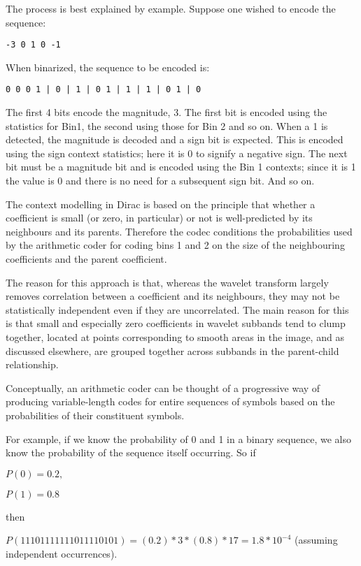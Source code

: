 The process is best explained by example. Suppose one wished to encode
the sequence:

\begin{verbatim}
-3 0 1 0 -1
\end{verbatim}

When binarized, the sequence to be encoded is:

\begin{verbatim}
0 0 0 1 | 0 | 1 | 0 1 | 1 | 1 | 0 1 | 0
\end{verbatim}

The first 4 bits encode the magnitude, 3. The first bit is encoded using
the statistics for Bin1, the second using those for Bin 2 and so on.
When a 1 is detected, the magnitude is decoded and a sign bit is
expected. This is encoded using the sign context statistics; here it is
0 to signify a negative sign. The next bit must be a magnitude bit and
is encoded using the Bin 1 contexts; since it is 1 the value is 0 and
there is no need for a subsequent sign bit. And so on.

The context modelling in Dirac is based on the principle that whether a
coefficient is small (or zero, in particular) or not is well-predicted
by its neighbours and its parents. Therefore the codec conditions the
probabilities used by the arithmetic coder for coding bins 1 and 2 on
the size of the neighbouring coefficients and the parent coefficient.

The reason for this approach is that, whereas the wavelet transform
largely removes correlation between a coefficient and its neighbours,
they may not be statistically independent even if they are uncorrelated.
The main reason for this is that small and especially zero coefficients
in wavelet subbands tend to clump together, located at points
corresponding to smooth areas in the image, and as discussed elsewhere,
are grouped together across subbands in the parent-child relationship.

Conceptually, an arithmetic coder can be thought of a progressive way of
producing variable-length codes for entire sequences of symbols based on
the probabilities of their constituent symbols.

For example, if we know the probability of 0 and 1 in a binary sequence,
we also know the probability of the sequence itself occurring. So if

$P(0)=0.2, $

$P(1)=0.8$

then

$P(11101111111011110101)=(0.2)*3*(0.8)*17=1.8 * 10^{-4}$ (assuming
independent occurrences).


